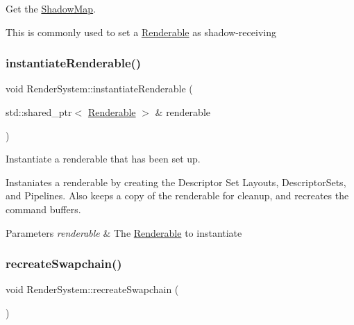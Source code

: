 Get the \mbox{\hyperlink{struct_shadow_map}{Shadow\+Map}}. 

This is commonly used to set a \mbox{\hyperlink{class_renderable}{Renderable}} as shadow-\/receiving \mbox{\label{class_render_system_aeaee982760399e62180207c573a469e7}} 
\subsubsection{\texorpdfstring{instantiateRenderable()}{instantiateRenderable()}}
{\footnotesize\ttfamily void Render\+System\+::instantiate\+Renderable (\begin{DoxyParamCaption}\item[{std\+::shared\+\_\+ptr$<$ \mbox{\hyperlink{class_renderable}{Renderable}} $>$ \&}]{renderable }\end{DoxyParamCaption})}



Instantiate a renderable that has been set up. 

Instaniates a renderable by creating the Descriptor Set Layouts, Descriptor\+Sets, and Pipelines. Also keeps a copy of the renderable for cleanup, and recreates the command buffers.


\begin{DoxyParams}{Parameters}
{\em renderable} & The \mbox{\hyperlink{class_renderable}{Renderable}} to instantiate \\
\hline
\end{DoxyParams}
\mbox{\label{class_render_system_ab24aff4914313ebaa5d87633d2126b6d}} 
\subsubsection{\texorpdfstring{recreateSwapchain()}{recreateSwapchain()}}
{\footnotesize\ttfamily void Render\+System\+::recreate\+Swapchain (\begin{DoxyParamCaption}{ }\end{DoxyParamCaption})\hspace{0.3cm}{\ttfamily [private]}}



